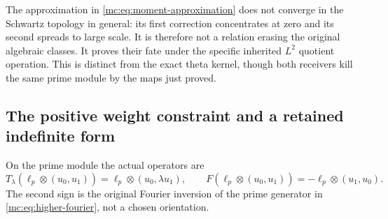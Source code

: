 \documentclass[11pt,a4paper]{article}
\theoremstyle{definition}\newtheorem{definition}[theorem]{Definition}
\begin{document}
The approximation in \eqref{mc:eq:moment-approximation} does not
converge in the Schwartz topology in general: its first correction
concentrates at zero and its second spreads to large scale. It is
therefore not a relation erasing the original algebraic classes.
It proves their fate under the specific inherited $L^2$ quotient
operation. This is distinct from the exact theta kernel, though
both receivers kill the same prime module by the maps just proved.

\subsection{The positive weight constraint and a retained indefinite form}

On the prime module the actual operators are
\[
 T_\lambda(\ell_p\otimes(u_0,u_1))
       =\ell_p\otimes(u_0,\lambda u_1),\qquad
 F(\ell_p\otimes(u_0,u_1))
       =-\ell_p\otimes(u_1,u_0).
 \tag{MC26}\label{mc:eq:prime-operators}
\]
The second sign is the original Fourier inversion of the prime
generator in \eqref{mc:eq:higher-fourier}, not a chosen orientation.
\end{document}
